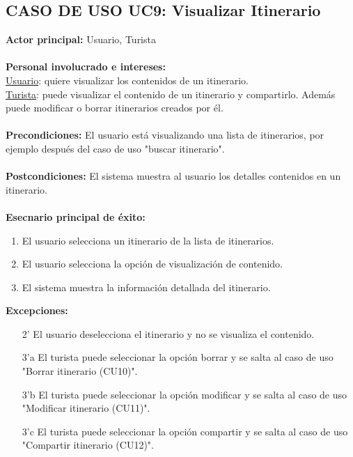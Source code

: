 \documentclass[11pt]{article}
\begin{document}
\subsection*{\textbf{CASO DE USO UC9:} Visualizar Itinerario }
\textbf{Actor principal:} Usuario, Turista\\
\\
\textbf{Personal involucrado e intereses: }\\
\underline{Usuario}: quiere visualizar los contenidos de un itinerario.\\
\underline{Turista}: puede visualizar el contenido de un itinerario y compartirlo. Además puede modificar o borrar itinerarios creados por él.
\\\\
\textbf{Precondiciones:} El usuario está visualizando una lista de itinerarios, por ejemplo después del caso de uso "buscar itinerario".\\
\\
\textbf{Postcondiciones:} El sistema muestra al usuario los detalles contenidos en un itinerario.\\
\\
\textbf{Esecnario principal de éxito:}
\begin{enumerate}
\item El usuario selecciona un itinerario de la lista de itinerarios.
\item El usuario selecciona la opción de visualización de contenido.
\item El sistema muestra la información detallada del itinerario.
\end{enumerate}
\textbf{Excepciones:}
\begin{enumerate}
\item[2'] El usuario deselecciona el itinerario y no se visualiza el contenido.
\item[3'a] El turista puede seleccionar la opción borrar y se salta al caso de uso "Borrar itinerario (CU10)".
\item[3'b] El turista puede seleccionar la opción modificar y se salta al caso de uso "Modificar itinerario (CU11)".
\item[3'c] El turista puede seleccionar la opción compartir y se salta al caso de uso "Compartir itinerario (CU12)".
\end{enumerate}
\end{document}
